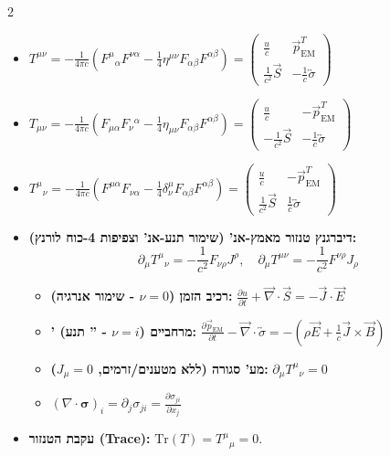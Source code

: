 \documentclass[10pt,a4paper]{article}
\begin{document}
\begin{multicols*}{2}
\begin{itemize}
    \item 
    $T^{\mu\nu} = -\frac{1}{4\pi c} \left( F^\mu{}_\alpha F^{\nu\alpha} - \frac{1}{4}\eta^{\mu\nu}F_{\alpha\beta}F^{\alpha\beta} \right) 
    = \begin{pmatrix} 
    \frac{u}{c} & \vec{p}_{\text{EM}}^T \\
    \frac{1}{c^2}\vec{S} & -\frac{1}{c}\overleftrightarrow{\sigma}
    \end{pmatrix}
    $

    \item $
    T_{\mu\nu} = -\frac{1}{4\pi c} \left( F_{\mu\alpha}F_\nu{}^\alpha - \frac{1}{4}\eta_{\mu\nu}F_{\alpha\beta}F^{\alpha\beta} \right)
    = \begin{pmatrix} 
    \frac{u}{c} & -\vec{p}_{\text{EM}}^T \\
    -\frac{1}{c^2}\vec{S} & -\frac{1}{c}\overleftrightarrow{\sigma}
    \end{pmatrix}
    $

    \item $T^\mu{}_\nu = -\frac{1}{4\pi c} \left( F^{\mu\alpha} F_{\nu\alpha} - \frac{1}{4}\delta^\mu_\nu F_{\alpha\beta}F^{\alpha\beta} \right) 
    = \begin{pmatrix} 
    \frac{u}{c} & -\vec{p}_{\text{EM}}^T \\
    \frac{1}{c^2}\vec{S} & \frac{1}{c}\overleftrightarrow{\sigma}
    \end{pmatrix}
    $

    \item \textbf{דיברגנץ טנזור מאמץ-אנ' (שימור תנע-אנ' וצפיפות 4-כוח לורנץ):}
    \[
    \partial_\mu T^\mu{}_\nu = -\frac{1}{c^2} F_{\nu\rho} J^\rho, \quad \partial_\mu T^{\mu\nu} = -\frac{1}{c^2} F^{\nu\rho} J_\rho
    \]

    \begin{itemize}
        \item \textbf{רכיב הזמן ($\nu=0$ - שימור אנרגיה):} $\frac{\partial u}{\partial t} + \vec{\nabla} \cdot \vec{S} = -\vec{J} \cdot \vec{E}$
        \item \textbf{' מרחביים ($\nu=i$ - '' תנע):} $\frac{\partial \vec{p}_{\text{EM}}}{\partial t} - \vec{\nabla} \cdot \overleftrightarrow{\sigma} = -\left( \rho \vec{E} + \frac{1}{c} \vec{J} \times \vec{B} \right)$
        \item \textbf{מע' סגורה (ללא מטענים/זרמים, $J_\mu=0$):} $\partial_\mu T^\mu{}_\nu = 0$
        \item 
        $
        (\nabla \cdot \mathbf{\sigma})_i = \partial_j \sigma_{ji} = \frac{\partial \sigma_{ji}}{\partial x_j}
        $
    \end{itemize}
    \item \textbf{עקבת הטנזור \textenglish{(Trace)}:} $\text{Tr}(T) = T^\mu{}_\mu = 0$.
\end{itemize}


\end{multicols*}
\end{document}
